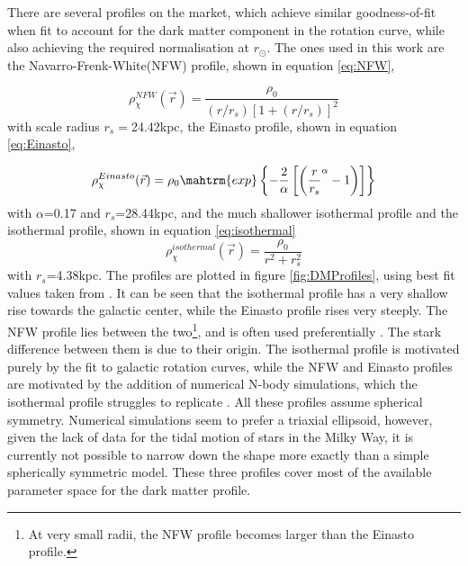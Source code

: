 There are several profiles on the market, which achieve similar goodness-of-fit when fit to account for the dark matter component in the rotation curve\cite{}, while also achieving the required normalisation at $r_\odot$. The ones used in this work are the Navarro-Frenk-White(NFW) profile\cite{}, shown in equation \ref{eq:NFW}, 

\begin{equation}\label{eq:NFW}
    \rho_\chi^{NFW}(\vec{r}) = \frac{\rho_0}{(r/r_s)[1+(r/r_s)]^2}
\end{equation}
with scale radius $r_s=$24.42kpc, the Einasto profile\cite{}, shown in equation \ref{eq:Einasto}, 

\begin{equation}\label{eq:Einasto}
    \rho_\chi^{Einasto}(\vec{r}) = \rho_0 \mahtrm{exp} \left\{ -\frac{2}{\alpha}\left[ \left( \frac{r}{r_s}^\alpha -1\right) \right] \right\}
\end{equation}
with $\alpha$=0.17 and $r_s$=28.44kpc, and the much shallower isothermal profile \cite{} and the isothermal profile, shown in equation \ref{eq:isothermal}
\begin{equation}\label{eq:isothermal}
    \rho_\chi^{isothermal}(\vec{r}) = \frac{\rho_0}{r^2+r_s^2}
\end{equation}
with $r_s$=4.38kpc. The profiles are plotted in figure \ref{fig:DMProfiles}, using best fit values taken from \cite{Ibarra}. It can be seen that the isothermal profile has a very shallow rise towards the galactic center, while the Einasto profile rises very steeply. The NFW profile lies between the two\footnote{At very small radii, the NFW profile becomes larger than the Einasto profile.}, and is often used preferentially \cite{}. The stark difference between them is due to their origin. The isothermal profile is motivated purely by the fit to galactic rotation curves, while the NFW and Einasto profiles are motivated by the addition of numerical N-body simulations, which the isothermal profile struggles to replicate \cite{}. All these profiles assume spherical symmetry. Numerical simulations seem to prefer a triaxial ellipsoid, however, given the lack of data for the tidal motion of stars in the Milky Way, it is currently not possible to narrow down the shape more exactly than a simple spherically symmetric model. These three profiles cover most of the available parameter space for the dark matter profile. \\

